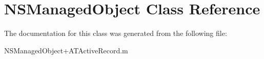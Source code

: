 \hypertarget{class_n_s_managed_object}{
\section{NSManagedObject Class Reference}
\label{class_n_s_managed_object}
}


The documentation for this class was generated from the following file:\begin{DoxyCompactItemize}
\item 
NSManagedObject+ATActiveRecord.m\end{DoxyCompactItemize}
